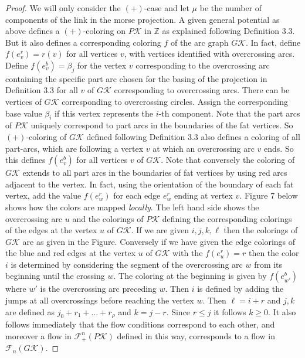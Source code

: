 \documentclass[11pt]{article}
\theoremstyle{definition}
\theoremstyle{remark}
\theoremstyle{remark}
\begin{document}
\begin{proof} We will only consider the $(+)$-case and let $\mu $ be the number of components of the link in the morse projection. A given general potential as above defines a $(+)$-coloring on $P\mathcal{K}$ 
in $\mathbb{Z}$ as explained following Definition 3.3. But it also defines a corresponding coloring $f$ of the arc graph $G\mathcal{K}$. In fact, define $f(e_v^r)=r(v)$ for all vertices $v$, with vertices identified with overcrossing arcs. Define $f(e_v^b)=\beta_j$ for the vertex $v$ corresponding to the overcrossing arc containing the specific part arc chosen for the basing of the projection in Definition 3.3 for all $v$ of $G\mathcal{K}$ corresponding to overcrossing arcs. There can be vertices of $G\mathcal{K}$ corresponding to overcrossing circles. Assign the corresponding base value $\beta_i$ if this vertex represents the $i$-th component. Note that the part arcs of $P\mathcal{K}$ uniquely correspond to part arcs in the boundaries of the fat vertices. So $(+)$-coloring of $G\mathcal{K}$ defined following Definition 3.3 also defines a coloring of all part-arcs, which are following a vertex $v$ at which an overcrossing arc $v$ ends. So this defines $f(e_v^b)$ for all vertices $v$ of $G\mathcal{K}$. Note that conversely the coloring of $G\mathcal{K}$ extends to all part arcs in the boundaries of fat vertices by using red arcs adjacent to the vertex. In fact, using the orientation of the boundary of each fat vertex, add the value $f(e_w^r)$ for each edge $e_w^r$ ending at vertex $v$.
Figure 7 below shows how the colors are mapped \textit{locally}. The left hand side shows the overcrossing arc 
$u$ and the colorings of $P\mathcal{K}$ defining the corresponding colorings of the edges at the vertex $u$ of $G\mathcal{K}$. If we are given $i,j,k,\ell $ then the colorings of $G\mathcal{K}$ are as given in the Figure. 
Conversely if we have given the edge colorings of the blue and red edges at the vertex $u$ of $G\mathcal{K}$ with the $f(e_u^r)=r$ then the color $i$ is determined by considering the segment of the overcrossing arc $w$ from its beginning until the crossing $w$. The coloring at the beginning is given by $f(e_{w'}^b)$ where $w'$ is the overcrossing arc preceding $w$. Then $i$ is defined by adding the jumps at all overcrossings before reaching the vertex $w$. Then $\ell =i+r$ and $j,k$ are defined as $j_0+r_1+\ldots +r_{\rho }$ and $k=j-r$. Since $r\leq j$ it follows $k\geq 0$. It also follows immediately that  
the flow conditions correspond to each other, and moreover a flow in $\mathcal{F}_+^n(P\mathcal{K})$ defined in this way, corresponds to a flow in $\mathcal{F}_n(G\mathcal{K})$.

\end{proof}
\end{document}
